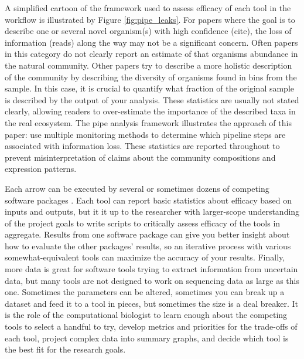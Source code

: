 A simplified cartoon of the framework used to assess efficacy of each tool in the workflow is illustrated by Figure \ref{fig:pipe_leaks}.
For papers where the goal is to describe one or several novel organism(s) with high confidence (cite), the loss of information (reads) along the way may not be a significant concern.
Often papers in this category do not clearly report an estimate of that organisms abundance in the natural community.
Other papers try to describe a more holistic description of the community \cite{kantor2017} by describing the diversity of organisms found in bins from the sample.
In this case, it is crucial to quantify what fraction of the original sample is described by the output of your analysis.
These statistics are usually not stated clearly, allowing readers to over-estimate the importance of the described taxa in the real ecosystem.
The pipe analysis framework illustrates the approach of this paper: use multiple monitoring methods to determine which pipeline steps are associated with information loss.
These statistics are reported throughout to prevent misinterpretation of claims about the community compositions and expression patterns.

Each arrow can be executed by several or sometimes dozens of competing software packages \cite{sangwan2016,thomas2012}.
Each tool can report basic statistics about efficacy based on inputs and outputs, but it it up to the researcher with larger-scope understanding of the project goals to write scripts to critically assess efficacy of the tools in aggregate.
Results from one software package can give you better insight about how to evaluate the other packages' results, so an iterative process with various somewhat-equivalent tools can maximize the accuracy of your results.
Finally, more data is great for software tools trying to extract information from uncertain data, but many tools are not designed to work on sequencing data as large as this one.
Sometimes the parameters can be altered, sometimes you can break up a dataset and feed it to a tool in pieces, but sometimes the size is a deal breaker.
It is the role of the computational biologist to learn enough about the competing tools to select a handful to try, develop metrics and priorities for the trade-offs of each tool, project complex data into summary graphs, and decide which tool is the best fit for the research goals.

